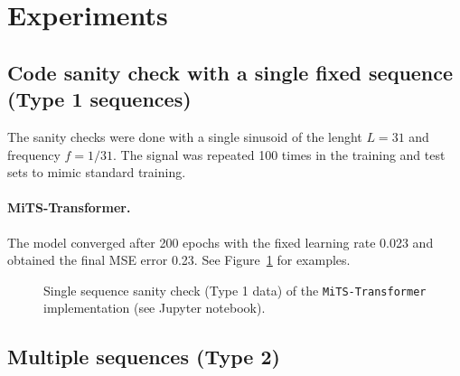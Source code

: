 \documentclass[final]{article}
\begin{document}
\section{Experiments}

%
%
\subsection{Code sanity check with a single fixed sequence (Type 1 sequences)}
The sanity checks were done with a single sinusoid of the lenght $L=31$ and frequency $f=1/31$. The signal was repeated 100 times in the training and test sets to mimic standard training.

\paragraph{MiTS-Transformer.}
The model converged after 200 epochs with the fixed learning rate 0.023 and obtained the final MSE error 0.23. See Figure~\ref{fig:sanity_MiCoDaT} for examples.

\begin{figure}[h]
  \centering
  \caption{Single sequence sanity check (Type 1 data) of the \texttt{MiTS-Transformer} implementation (see Jupyter notebook).\label{fig:sanity_MiCoDaT}}
\end{figure}


%
%
\subsection{Multiple sequences (Type 2)}
\end{document}
